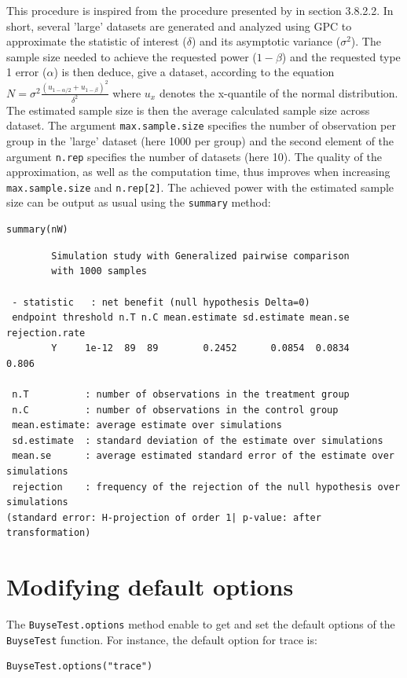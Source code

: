 \documentclass[12pt]{article}
\begin{document}
This procedure is inspired from the procedure presented by
\cite{brunner2018rank} in section 3.8.2.2. In short, several 'large'
datasets are generated and analyzed using GPC to approximate the
statistic of interest (\(\delta\)) and its asymptotic variance
(\(\sigma^2\)). The sample size needed to achieve the requested power
(\(1-\beta\)) and the requested type 1 error (\(\alpha\)) is then
deduce, give a dataset, according to the equation \(N = \sigma^2
\frac{\left(u_{1-\alpha/2}+u_{1-\beta}\right)^2}{\delta^2}\) where
\(u_x\) denotes the x-quantile of the normal distribution. The
estimated sample size is then the average calculated sample size
across dataset. The argument \texttt{max.sample.size} specifies the number of
observation per group in the 'large' dataset (here 1000 per group) and
the second element of the argument \texttt{n.rep} specifies the number of
datasets (here 10). The quality of the approximation, as well as the
computation time, thus improves when increasing \texttt{max.sample.size} and
\texttt{n.rep[2]}. The achieved power with the estimated sample size can be
output as usual using the \texttt{summary} method:
\lstset{language=r,label= ,caption= ,captionpos=b,numbers=none}
\begin{lstlisting}
summary(nW)
\end{lstlisting}

\begin{verbatim}
        Simulation study with Generalized pairwise comparison
        with 1000 samples

 - statistic   : net benefit (null hypothesis Delta=0)
 endpoint threshold n.T n.C mean.estimate sd.estimate mean.se rejection.rate
        Y     1e-12  89  89        0.2452      0.0854  0.0834          0.806

 n.T          : number of observations in the treatment group
 n.C          : number of observations in the control group
 mean.estimate: average estimate over simulations
 sd.estimate  : standard deviation of the estimate over simulations
 mean.se      : average estimated standard error of the estimate over simulations
 rejection    : frequency of the rejection of the null hypothesis over simulations
(standard error: H-projection of order 1| p-value: after transformation)
\end{verbatim}

\clearpage

\section{Modifying default options}
\label{sec:org94fef85}
The \texttt{BuyseTest.options} method enable to get and set the default
options of the \texttt{BuyseTest} function. For instance, the default option
for trace is:
\lstset{language=r,label= ,caption= ,captionpos=b,numbers=none}
\begin{lstlisting}
BuyseTest.options("trace")
\end{lstlisting}
\end{document}

